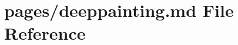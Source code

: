 \hypertarget{deeppainting_8md}{}\section{pages/deeppainting.md File Reference}
\label{deeppainting_8md}
